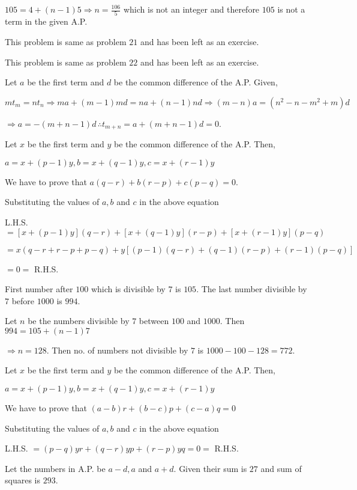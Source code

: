   $105 = 4 + (n - 1)5 \Rightarrow n = \frac{106}{5}$ which is not an integer and therefore $105$ is not a term in the given A.P.
\item This problem is same as problem $21$ and has been left as an exercise.
\item This problem is same as problem $22$ and has been left as an exercise.
\item Let $a$ be the first term and $d$ be the common difference of the A.P. Given,

  $mt_m = nt_n \Rightarrow ma + (m - 1)md = na + (n - 1)nd \Rightarrow (m - n)a = (n^2 - n - m^2 + m)d$

  $\Rightarrow a = -(m + n - 1)d\,\therefore t_{m + n} = a + (m + n - 1)d = 0$.
\item Let $x$ be the first term and $y$ be the common difference of the A.P. Then,

  $a = x + (p - 1)y, b = x + (q - 1)y, c = x + (r - 1)y$

  We have to prove that $a(q - r) + b(r - p) + c(p - q) = 0$.

  Substituting the values of $a, b$ and $c$ in the above equation

  L.H.S. $= [x + (p - 1)y](q - r) + [x + (q - 1)y](r - p) + [x + (r - 1)y](p - q)$

  $= x(q - r + r - p + p - q) + y[(p - 1)(q - r) + (q - 1)(r - p) + (r - 1)(p - q)]$

  $= 0 =$ R.H.S.
\item First number after $100$ which is divisible by $7$ is $105$. The last number divisible by $7$ before $1000$ is $994$.

  Let $n$ be the numbers divisible by $7$ between $100$ and $1000$. Then $994 = 105 + (n - 1)7$

  $\Rightarrow n = 128$. Then no. of numbers not divisible by $7$ is $1000 - 100 - 128 = 772$.
\item Let $x$ be the first term and $y$ be the common difference of the A.P. Then,

  $a = x + (p - 1)y, b = x + (q - 1)y, c = x + (r - 1)y$

  We have to prove that $(a - b)r + (b - c)p + (c - a)q = 0$

  Substituting the values of $a, b$ and $c$ in the above equation

  L.H.S. $= (p - q)yr + (q - r)yp + (r - p)yq = 0 =$ R.H.S.
\item Let the numbers in A.P. be $a - d, a$ and $a + d$. Given their sum is $27$ and sum of squares is $293$.

